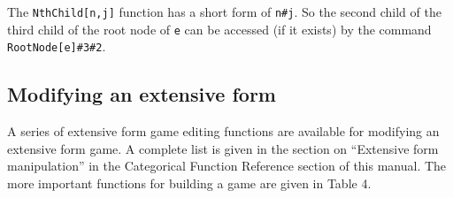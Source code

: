The \verb+NthChild[n,j]+ function has a short form of
\verb+n#j+.  So the second child of the third child of the root node
of \verb+e+ can be accessed (if it exists) by the command
\verb+RootNode[e]#3#2+.

\subsection{Modifying an extensive form}

A series of extensive form game editing functions are available for
modifying an extensive form game. A complete list is given in the
section on ``Extensive form manipulation'' in the Categorical Function
Reference section of this manual.  The more important functions for
building a game are given in Table 4.

